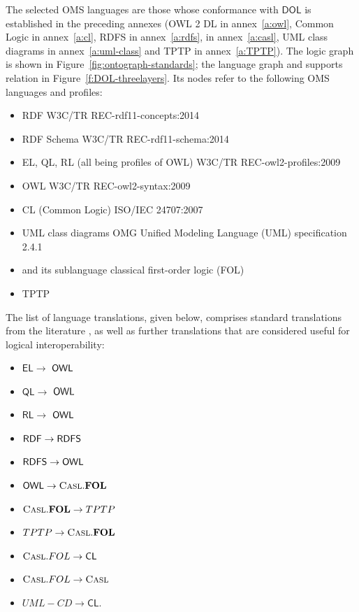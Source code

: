 \documentclass[10pt,fleqn,final]{scrreprt}
\newcommand{\cbs}[0]{\color{red}\xspace} %
\newcommand{\cbe}[0]{\color{black}\xspace} %
\newcommand*{\CL}{\ensuremath{\mathsf{CL}}\xspace}
\newcommand{\QL}{\ensuremath{\mathsf{QL}}\xspace}
\newcommand{\RL}{\ensuremath{\mathsf{RL}}\xspace}
\newcommand{\EL}{\ensuremath{\mathsf{EL}}\xspace}
\newcommand*{\DOL}{\ensuremath{\mathsf{DOL}}\xspace}
\newcommand{\annexrefname}{annex}
\newcommand{\figurerefname}{Figure}
\newcommand{\aref}[1]{\annexrefname~\ref{#1}}
\newcommand{\fref}[1]{\figurerefname~\ref{#1}}
\newcommand{\nisref}[1]{#1}
\newenvironment{definitions}[0]{\medskip }{}
\begin{document}
\begin{definitions}
\cbs The selected OMS languages\cbe
are those whose conformance with \DOL is established in the preceding annexes (OWL 2 DL in \aref{a:owl}, Common Logic in \aref{a:cl}, RDFS in \aref{a:rdfs},
\CASL in \aref{a:casl}, UML class diagrams in \aref{a:uml-class} and TPTP in \aref{a:TPTP}).  The logic graph is shown in \fref{fig:ontograph-standards}; the language graph and supports relation in \fref{f:DOL-threelayers}.  Its nodes refer to the following OMS languages and profiles:
\begin{itemize}
\item RDF \nisref{W3C/TR REC-rdf11-concepts:2014}
\item RDF Schema \nisref{W3C/TR REC-rdf11-schema:2014}
\item EL, QL, RL (all being profiles of OWL) \nisref{W3C/TR REC-owl2-profiles:2009}
\item OWL \nisref{W3C/TR REC-owl2-syntax:2009}
\item CL (Common Logic) \nisref{ISO/IEC 24707:2007}
\item UML class diagrams \nisref{OMG Unified Modeling Language (UML) specification 2.4.1}
\item \CASL \cite{CASL-RM} and its sublanguage classical first-order logic (FOL)
\item TPTP
\end{itemize}

 The list of
language translations, given below, comprises standard translations from the literature  \cite{OntoGraph,MossakowskiEtAl14b},
as well as further translations that are considered useful for
logical interoperability:
\begin{itemize}
  \item \EL $\to$ $\mathsf{OWL}$ 
  \item \QL $\to$ $\mathsf{OWL}$
  \item \RL $\to$ $\mathsf{OWL}$
  \item $\mathsf{RDF} \to \mathsf{RDFS}$
  \item $\mathsf{RDFS} \to \mathsf{OWL}$
  \item $\mathsf{OWL}  \to \textmd{\textsc{Casl}}.\mathbf{FOL}$
  \item $\textmd{\textsc{Casl}}.\mathbf{FOL} \to TPTP$
  \item $TPTP \to \textmd{\textsc{Casl}}.\mathbf{FOL}$
  \item $\CASL.FOL \to \CL$
  \item $\textmd{\textsc{Casl}}.FOL \to \textmd{\textsc{Casl}}$
  \item $UML-CD \to \CL$.
\end{itemize}


\end{definitions}
\end{document}
